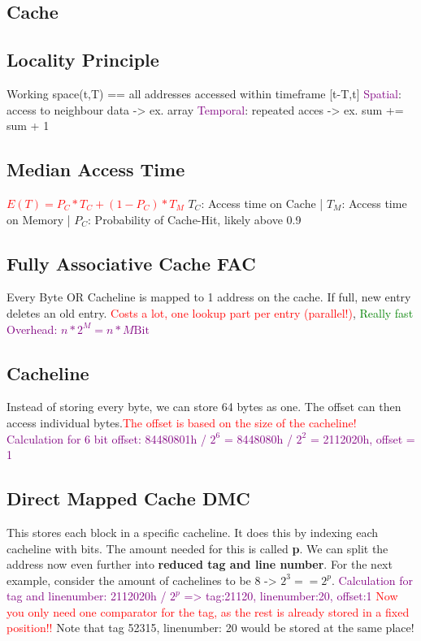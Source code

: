 \documentclass[main.tex,fontsize=7pt,paper=a4,paper=landscape,DIV=calc,]{scrartcl}
\begin{document}
\begin{multicols*}{4}
\section{Cache}

\subsection{Locality Principle}
Working space(t,T) == all addresses accessed within timeframe [t-T,t] \newline
\textcolor{purple}{Spatial}: access to neighbour data -> ex. array\newline
\textcolor{purple}{Temporal}: repeated acces -> ex. sum += sum + 1

\subsection{Median Access Time}
\textcolor{red}{\(E(T) = P_C * T_C + (1 - P_C )* T_M\)}\newline
\(T_C\): Access time on Cache |
\(T_M\): Access time on Memory |
\(P_C\): Probability of Cache-Hit, likely above 0.9

\subsection{Fully Associative Cache FAC}
Every Byte OR Cacheline is mapped to 1 address on the cache. If full, new entry deletes an old entry.
\textcolor{red}{Costs a lot, one lookup part per entry (parallel!)}, \textcolor{green}{Really fast}\newline
\textcolor{purple}{Overhead: \(n * 2^M = n * M \text{Bit}\)}

\subsection{Cacheline}
Instead of storing every byte, we can store 64 bytes as one. The offset can then access individual bytes.\newline \textcolor{red}{The offset is based on the size of the cacheline!}
\textcolor{purple}{Calculation for 6 bit offset: 84480801h / \(2^6\) = 8448080h / \(2^2\) = 2112020h, offset = 1 }

\subsection{Direct Mapped Cache DMC}
This stores each block in a specific cacheline. 
It does this by indexing each cacheline with bits. The amount needed for this is called \textbf{p}. 
We can split the address now even further into \textbf{reduced tag and line number}.
For the next example, consider the amount of cachelines to be 8 -> \(2^3 == 2^p\).
\textcolor{purple}{Calculation for tag and linenumber: 2112020h / \(2^p\) => tag:21120, linenumber:20, offset:1}
\textcolor{red}{Now you only need one comparator for the tag, as the rest is already stored in a fixed position!!}\newline
\textcolor{OliveGreen}{Note that tag 52315, linenumber: 20 would be stored at the same place!}


\end{multicols*}
\end{document}
